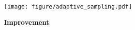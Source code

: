 \begin{figure}[ht]
    \centering %

    {\texttt{[image: figure/adaptive\_sampling.pdf]}}
    \caption{\textbf{Improvement} }
    \label{fig:adaptive}
\end{figure}


